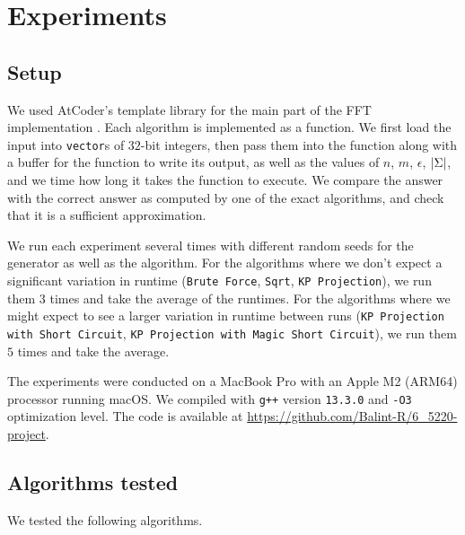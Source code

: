\documentclass{article}
\theoremstyle{definition}
\newcommand{\eps}{\epsilon}
\DeclarePairedDelimiter{\abs}{\lvert}{\rvert}
\begin{document}
\section{Experiments}

\subsection{Setup}

We used AtCoder's template library for the main part of the FFT implementation \cite{ac_library}.
Each algorithm is implemented as a function.
We first load the input into \texttt{vector}s of $32$-bit integers, then pass them into the function along with a buffer for the function to write its output, as well as the values of $n$, $m$, $\eps$, $\abs{\Sigma}$, and we time how long it takes the function to execute.
We compare the answer with the correct answer as computed by one of the exact algorithms, and check that it is a sufficient approximation.

We run each experiment several times with different random seeds for the generator as well as the algorithm.
For the algorithms where we don't expect a significant variation in runtime (\texttt{Brute Force}, \texttt{Sqrt}, \texttt{KP Projection}), we run them $3$ times and take the average of the runtimes.
For the algorithms where we might expect to see a larger variation in runtime between runs (\texttt{KP Projection with Short Circuit}, \texttt{KP Projection with Magic Short Circuit}), we run them $5$ times and take the average.

The experiments were conducted on a MacBook Pro with an Apple M2 (ARM64) processor running macOS. We compiled with \texttt{g++} version \texttt{13.3.0} and \texttt{-O3} optimization level. 
The code is available at \href{https://github.com/Balint-R/6_5220-project}{https://github.com/Balint-R/6\_5220-project}.

\subsection{Algorithms tested}

We tested the following algorithms.
\end{document}
